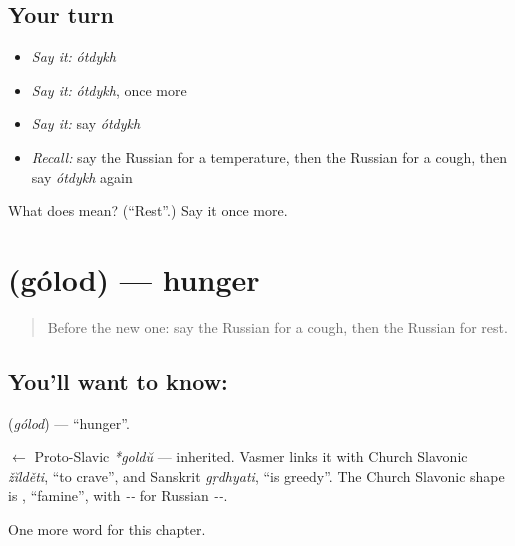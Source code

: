 \subsection*{Your turn}
\begin{itemize}
\raggedright
  \item \emph{Say it:} \emph{ótdykh}
  \item \emph{Say it:} \emph{ótdykh}, once more
  \item \emph{Say it:} say \emph{ótdykh}
  \item \emph{Recall:} say the Russian for a temperature, then the Russian for a cough, then say \emph{ótdykh} again
\end{itemize}

\begin{tcolorbox}[breakable,colback=teal!4,colframe=teal!35!black,title={Before you move on}]
What does  mean? (\textquotedblleft{}Rest\textquotedblright{}.) Say it once more.
\end{tcolorbox}
\section[\texorpdfstring{\ru{голод} (gólod)}{голод (gólod)}]{ (gólod) — hunger}

\label{lesson:RU-C33-hunger}



\begin{quote}
Before the new one: say the Russian for a cough, then the Russian for rest.
\end{quote}

\subsection*{You'll want to know: }
\textbf{} (\emph{gólod}) — \textquotedblleft{}hunger\textquotedblright{}.

\begin{cousinweb}
\textbf{} $\leftarrow$ Proto-Slavic \emph{*goldŭ} — inherited. Vasmer links it with Church Slavonic \emph{žĭlděti}, \textquotedblleft{}to crave\textquotedblright{}, and Sanskrit \emph{gṛdhyati}, \textquotedblleft{}is greedy\textquotedblright{}. The Church Slavonic shape is \emph{}, \textquotedblleft{}famine\textquotedblright{}, with \emph{--} for Russian \emph{--}.
\end{cousinweb}

\begin{grammarlens}[title={What you've built}]
One more word for this chapter.
\end{grammarlens}


